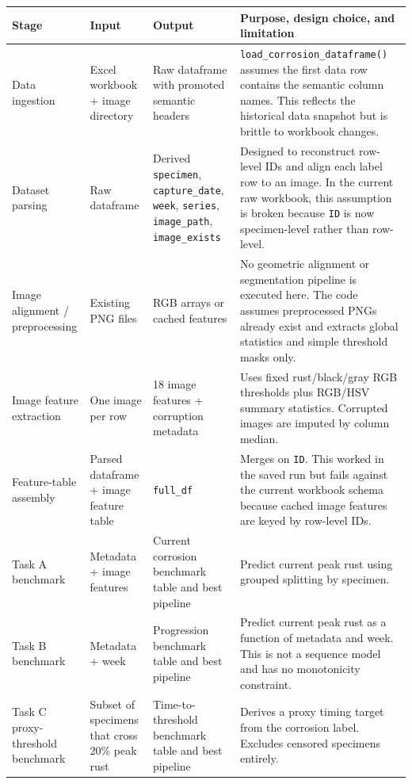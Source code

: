 \documentclass[11pt]{article}
\begin{document}
\begin{table}[H]
\centering
\small
\begin{tabularx}{\textwidth}{p{} p{} p{} Y}
\toprule
\textbf{Stage} & \textbf{Input} & \textbf{Output} & \textbf{Purpose, design choice, and limitation} \\
\midrule
Data ingestion & Excel workbook + image directory & Raw dataframe with promoted semantic headers & \texttt{load\_corrosion\_dataframe()} assumes the first data row contains the semantic column names. This reflects the historical data snapshot but is brittle to workbook changes. \\
Dataset parsing & Raw dataframe & Derived \texttt{specimen}, \texttt{capture\_date}, \texttt{week}, \texttt{series}, \texttt{image\_path}, \texttt{image\_exists} & Designed to reconstruct row-level IDs and align each label row to an image. In the current raw workbook, this assumption is broken because \texttt{ID} is now specimen-level rather than row-level. \\
Image alignment / preprocessing & Existing PNG files & RGB arrays or cached features & No geometric alignment or segmentation pipeline is executed here. The code assumes preprocessed PNGs already exist and extracts global statistics and simple threshold masks only. \\
Image feature extraction & One image per row & 18 image features + corruption metadata & Uses fixed rust/black/gray RGB thresholds plus RGB/HSV summary statistics. Corrupted images are imputed by column median. \\
Feature-table assembly & Parsed dataframe + image feature table & \texttt{full\_df} & Merges on \texttt{ID}. This worked in the saved run but fails against the current workbook schema because cached image features are keyed by row-level IDs. \\
Task A benchmark & Metadata + image features & Current corrosion benchmark table and best pipeline & Predict current peak rust using grouped splitting by specimen. \\
Task B benchmark & Metadata + week & Progression benchmark table and best pipeline & Predict current peak rust as a function of metadata and week. This is not a sequence model and has no monotonicity constraint. \\
Task C proxy-threshold benchmark & Subset of specimens that cross 20\% peak rust & Time-to-threshold benchmark table and best pipeline & Derives a proxy timing target from the corrosion label. Excludes censored specimens entirely. \\

\end{tabularx}
\end{table}
\end{document}
